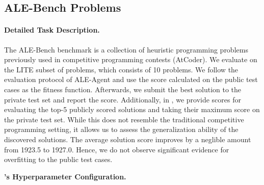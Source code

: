 \clearpage
\subsection{ALE-Bench Problems}

\paragraph{Detailed Task Description.} The ALE-Bench benchmark \citep{imajuku2025ale} is a collection of heuristic programming problems previously used in competitive programming contests (AtCoder). We evaluate \ouralgo on the LITE subset of problems, which consists of 10 problems. We follow the evaluation protocol of ALE-Agent \citep{imajuku2025ale} and use the score calculated on the public test cases as the fitness function. Afterwards, we submit the best solution to the private test set and report the score. Additionally, in , we provide scores for evaluating the top-5 publicly scored solutions and taking their maximum score on the private test set. While this does not resemble the traditional competitive programming setting, it allows us to assess the generalization ability of the discovered solutions. The average solution score improves by a neglible amount from 1923.5 to 1927.0. Hence, we do not observe significant evidence for overfitting to the public test cases.

\textbf{\ouralgo's Hyperparameter Configuration.}

